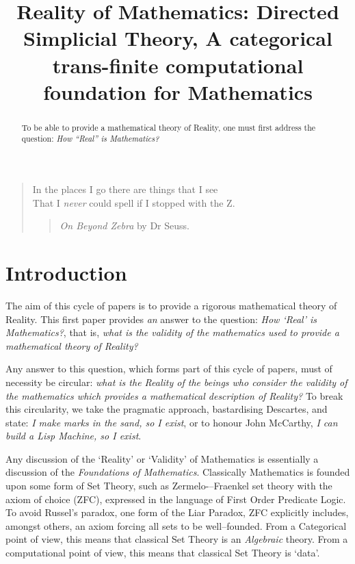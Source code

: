 \documentclass[a4paper,openany]{amsbook}
\begin{document}
\frontmatter
\sloppy

\title[DiSimplicial Theory]{Reality of Mathematics: Directed Simplicial Theory, A 
categorical trans-finite computational foundation for Mathematics}

%

\begin{abstract}
To be able to provide a mathematical theory of Reality, one must first 
address the question: \textit{How ``Real'' is Mathematics?}
\end{abstract} 
\maketitle 
\tableofcontents 
\mainmatter

\begin{quotation}
In the places I go there are things that I see\\
That I \emph{never} could spell if I stopped with the Z.\\
\begin{quote}
\textit{On Beyond Zebra} by Dr Seuss.
\end{quote}
\end{quotation}

\section{Introduction}

The aim of this cycle of papers is to provide a rigorous mathematical theory of
Reality. This first paper provides \emph{an} answer to the question: \emph{How
`Real' is Mathematics?}, that is, \emph{what is the validity of the
mathematics used to provide a mathematical theory of Reality?}

Any answer to this question, which forms part of this cycle of papers, must of
necessity be circular: \emph{what is the Reality of the beings who consider the
validity of the mathematics which provides a mathematical description of
Reality?} To break this circularity, we take the pragmatic approach,
bastardising Descartes, and state: \emph{I make marks in the sand, so I exist},
or to honour John McCarthy, \emph{I can build a Lisp Machine, so I exist}.

Any discussion of the `Reality' or `Validity' of Mathematics is essentially a
discussion of the \textit{Foundations of Mathematics}. Classically Mathematics
is founded upon some form of Set Theory, such as Zermelo-–Fraenkel set theory
with the axiom of choice (ZFC), expressed in the language of First Order
Predicate Logic. To avoid Russel's paradox, one form of the Liar Paradox, ZFC
explicitly includes, amongst others, an axiom forcing all sets to be
well--founded. From a Categorical point of view, this means that classical Set
Theory is an \emph{Algebraic} theory. From a computational point of view, this
means that classical Set Theory is `data'.
\end{document}
